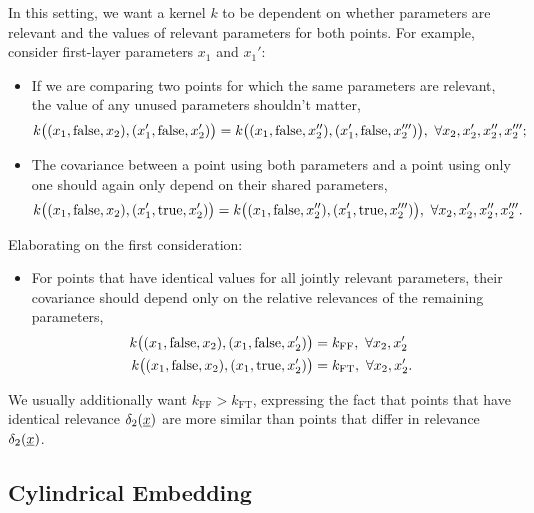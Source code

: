 \documentclass{article}
\newcommand{\vect}[1]{\underline{\smash{#1}}}
\renewcommand{\v}[1]{\vect{#1}}
\begin{document}
In this setting, we want a kernel $k$ to be dependent on whether parameters are relevant and the values of relevant parameters for both points. For example, consider first-layer parameters $x_1$ and $x_1'$:

\begin{itemize}
\item If we are comparing two points for which the same parameters are relevant, the value of any unused parameters shouldn't matter,  
\begin{equation}
 k\bigl((x_1, \textnormal{false}, x_2), (x_1', \textnormal{false}, x_2') \bigr)
= k\bigl((x_1, \textnormal{false}, x_2''), (x_1', \textnormal{false}, x_2''')\bigr),\ 
\forall x_2, x_2', x_2'', x_2''';
\end{equation}
\item The covariance between a point using both parameters and a point using only one should again only depend on their shared parameters,
\begin{equation}
 k\bigl((x_1, \textnormal{false}, x_2), (x_1', \textnormal{true}, x_2') \bigr)
= k\bigl((x_1, \textnormal{false}, x_2''), (x_1', \textnormal{true}, x_2''')\bigr),\ 
\forall x_2, x_2', x_2'', x_2'''.
\end{equation}
\end{itemize}

Elaborating on the first consideration:

\begin{itemize}
\item For points that have identical values for all jointly relevant parameters, their covariance should depend only on the relative relevances of the remaining parameters,
\begin{align}
 k\bigl((x_1, \textnormal{false}, x_2), (x_1, \textnormal{false}, x_2') \bigr)
& = k_{\text{FF}},\ \forall x_2, x_2'\\
 k\bigl((x_1, \textnormal{false}, x_2), (x_1, \textnormal{true}, x_2') \bigr)
& = k_{\text{FT}},\ \forall x_2, x_2'.
\end{align}
\end{itemize}
We usually additionally want $k_{\text{FF}}>k_{\text{FT}}$, expressing the fact that points that have identical relevance $\delta_2({\v{x}})$ are more similar than points that differ in relevance $\delta_2({\v{x}})$.


\subsection{Cylindrical Embedding}
\end{document}
